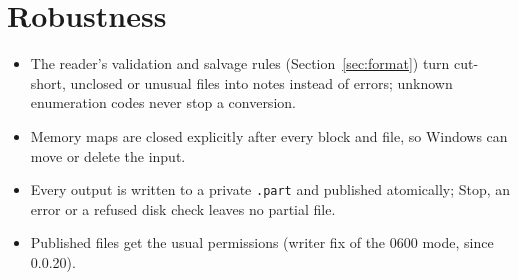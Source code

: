 \documentclass[11pt,a4paper]{article}
\newcommand{\code}[1]{\texttt{#1}}
\begin{document}
\section{Robustness}
\begin{itemize}[nosep]
\item The reader's validation and salvage rules (Section~\ref{sec:format}) turn cut-short, unclosed or
      unusual files into notes instead of errors; unknown enumeration codes never stop a conversion.
\item Memory maps are closed explicitly after every block and file, so Windows can move or delete the input.
\item Every output is written to a private \code{.part} and published atomically; Stop, an error or a
      refused disk check leaves no partial file.
\item Published files get the usual permissions (writer fix of the 0600 mode, since 0.0.20).
\end{itemize}
\end{document}
